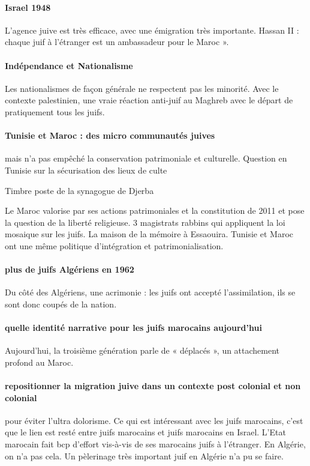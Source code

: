 \paragraph{Israel 1948} L’agence juive est très efficace, avec une émigration très importante. Hassan II : chaque juif à l’étranger est un ambassadeur pour le Maroc ». 

\paragraph{Indépendance et Nationalisme} Les nationalismes de façon générale ne respectent pas les minorité. Avec le contexte palestinien, une vraie réaction anti-juif au Maghreb avec le départ de pratiquement tous les juifs. 

\paragraph{Tunisie et Maroc : des micro communautés juives} mais n’a pas empêché la conservation patrimoniale et culturelle. Question en Tunisie sur la sécurisation des lieux de culte
\begin{Ex}
Timbre poste de la synagogue de Djerba
\end{Ex}
Le Maroc valorise par ses actions patrimoniales et la constitution de 2011 et pose la question de la liberté religieuse. 3 magistrats rabbins qui appliquent la loi mosaique sur les juifs. La maison de la mémoire à Essaouira. Tunisie et Maroc ont une même politique d’intégration et patrimonialisation.

\paragraph{plus de juifs Algériens en 1962}  Du côté des Algériens, une acrimonie : les juifs ont accepté l’assimilation, ils se sont donc coupés de la nation. 

\paragraph{quelle identité narrative pour les juifs marocains aujourd’hui} Aujourd’hui, la troisième génération parle de « déplacés », un attachement profond au Maroc.
\paragraph{repositionner la migration juive dans un contexte post colonial et non colonial} pour éviter l’ultra dolorisme. Ce qui est intéressant avec les juifs marocains, c’est que le lien est resté entre juifs marocains et juifs marocains en Israel. L’Etat marocain fait bcp d’effort vis-à-vis de ses marocains juifs à l’étranger. En Algérie, on n’a pas cela. Un pèlerinage très important juif en Algérie n’a pu se faire. 

